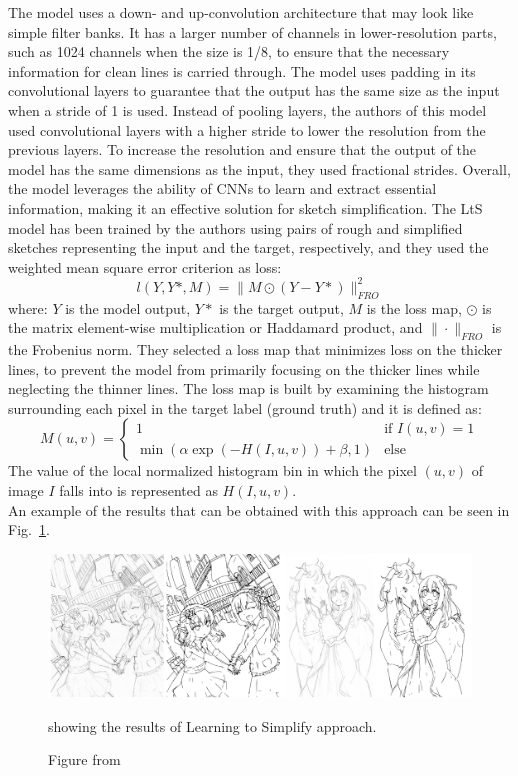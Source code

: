 \noindent The model uses a down- and up-convolution architecture that may look like simple filter banks. It has a larger number of channels in lower-resolution parts, such as 1024 channels when the size is 1/8, to ensure that the necessary information for clean lines is carried through. The model uses padding in its convolutional layers to guarantee that the output has the same size as the input when a stride of 1 is used. Instead of pooling layers, the authors of this model used convolutional layers with a higher stride to lower the resolution from the previous layers. To increase the resolution and ensure that the output of the model has the same dimensions as the input, they used fractional strides.
Overall, the model leverages the ability of CNNs to learn and extract essential information, making it an effective solution for sketch simplification.
The LtS model has been trained by the authors using pairs of rough and simplified sketches representing the input and the target, respectively, and they used the weighted mean square error criterion as loss:
\begin{equation}
    l(Y,Y*,M)=\|M \odot (Y-Y*)\|^2_{FRO}
\end{equation}
where: $Y$ is the model output, $Y*$ is the target output, $M$ is the loss map,  $\odot$ is the matrix element-wise multiplication or Haddamard product, and $\| \cdot \|_{FRO}$ is the Frobenius norm. They selected a loss map that minimizes loss on the thicker lines, to prevent the model from primarily focusing on the thicker lines while neglecting the thinner lines. The loss map is built by examining the histogram surrounding each pixel in the target label (ground truth) and it is  defined as:
\begin{equation}
    M(u,v) = 
    \begin{cases}
        1 & \text{if } I(u,v)=1\\
        \min (\alpha \exp (-H(I,u,v)) + \beta, 1) & \text{else}
    \end{cases}
\end{equation}
The value of the local normalized histogram bin in which the pixel $(u,v)$ of image $I$ falls into is represented as $H(I,u,v)$.\\
An example of the results that can be obtained with this approach can be seen in Fig.~\ref{fig:Learning to Simplify results}.
%
\begin{figure}[htbp]
\centering
  \includegraphics[scale=0.25]{figures/learnToSimplify-results-paper.png}
  \caption{Figure from \cite{SketchSimplify}} showing the results of Learning to Simplify approach.
  \label{fig:Learning to Simplify results}
\end{figure}
%
